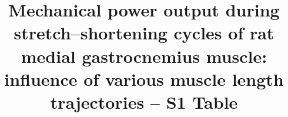 \documentclass[
  11pt,
  a4paper]{article}
\title{Mechanical power output during stretch--shortening cycles of rat
medial gastrocnemius muscle: influence of various muscle length
trajectories -- S1 Table}
\author{}
\date{}
\begin{document}
\linenumbers

\setcounter{supptbl}{0}

\renewcommand{\thesection}{S\arabic{section}}
\setcounter{section}{1}

\begin{supptbl}[H]

\caption{\label{supptbl-sscpa}SSC parameters, stimulation durations, and
measured AMPO of experimental stretch-shortening cycles with a 4 mm MTC
length excursion. Stimulation onset was set at the start of MTC
shortening in all conditions.}

\centering{

\centering


}

\end{supptbl}%
\end{document}
